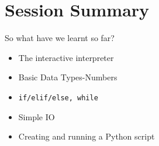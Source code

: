 \documentclass[14pt,compress]{beamer}
\newcommand{\typ}[1]{\texttt{#1}}
\begin{document}

\section{Session Summary}
\begin{frame}{So what have we learnt so far?}
  \begin{itemize}
    \item The interactive interpreter
    \item Basic Data Types-Numbers
    \item \typ{if/elif/else, while}
    \item Simple IO
    \item Creating and running a Python script
  \end{itemize}
\end{frame}
\end{document}
